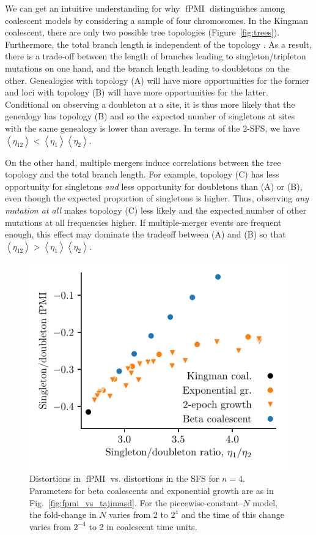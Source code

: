 \documentclass[11pt, letterpaper]{article}   	%
\newcommand{\fig}[1]{Fig.~\ref{#1}}
\newcommand{\Fig}[1]{Figure~\ref{#1}}
\newcommand{\E}[1]{\left< #1 \right>}
\DeclareMathOperator{\fpmi}{fPMI}
\begin{document}
We can get an intuitive understanding for why $\fpmi$ distinguishes among coalescent models by considering a sample of four chromosomes.
In the Kingman coalescent, there are only two possible tree topologies (\Fig{fig:trees}).
Furthermore, the total branch length is independent of the topology \autocite{Wakeley2009}.
As a result, there is a trade-off between the length of branches leading to singleton/tripleton mutations on one hand, and the branch length leading to doubletons on the other.
Genealogies with topology (A) will have more opportunities for the former and loci with topology (B) will have more opportunities for the latter.
Conditional on observing a doubleton at a site, it is thus more likely that the genealogy has topology (B) and so the expected number of singletons at sites with the same genealogy is lower than average.
In terms of the 2-SFS, we have $\E{\eta_{12}} < \E{\eta_{1}} \E{\eta_{2}}$.

On the other hand, multiple mergers induce correlations between the tree topology and the total branch length.
For example, topology (C) has less opportunity for singletons \emph{and} less opportunity for doubletons than (A) or (B), even though the expected proportion of singletons is higher.
Thus, observing \emph{any mutation at all} makes topology (C) less likely and the expected number of other mutations at all frequencies higher.
If multiple-merger events are frequent enough, this effect may dominate the tradeoff between (A) and (B) so that $\E{\eta_{12}} > \E{\eta_{1}} \E{\eta_{2}}$.

\begin{figure}
\centering
\includegraphics[scale=1]{figures/singleton-doubleton.pdf}
\caption{Distortions in $\fpmi$ vs. distortions in the SFS for $n=4$. Parameters for beta coalescents and exponential growth are as in \fig{fig:fpmi_vs_tajimasd}. For the piecewise-constant--$N$ model, the fold-change in $N$ varies from 2 to $2^4$ and the time of this change varies from $2^{-4}$ to 2 in coalescent time units. \label{fig:sdpmi_vs_sdratio}}
\end{figure}
\end{document}
